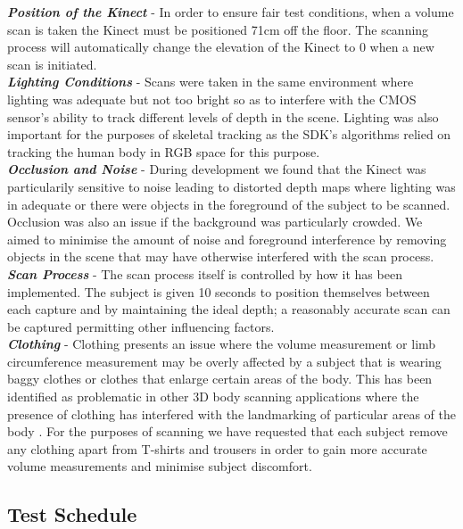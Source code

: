 \emph{\bf{Position of the Kinect}} - In order to ensure fair test conditions, when a volume scan is taken the Kinect must be positioned 71cm off the floor. The scanning process will automatically change the elevation of the Kinect to 0 when a new scan is initiated.\\

\emph{\bf{Lighting Conditions}} - Scans were taken in the same environment where lighting was adequate but not too bright so as to interfere with the CMOS sensor's ability to track different levels of depth in the scene. Lighting was also important for the purposes of skeletal tracking as the SDK's algorithms relied on tracking the human body in RGB space for this purpose. \\

\emph{\bf{Occlusion and Noise}} - During development we found that the Kinect was particularily sensitive to noise leading to distorted depth maps where lighting was in adequate or there were objects in the foreground of the subject to be scanned. Occlusion was also an issue if the background was particularly crowded. We aimed to minimise the amount of noise and foreground interference by removing objects in the scene that may have otherwise interfered with the scan process. \\

\emph{\bf{Scan Process}} - The scan process itself is controlled by how it has been implemented. The subject is given 10 seconds to position themselves between each capture and by maintaining the ideal depth; a reasonably accurate scan can be captured permitting other influencing factors. \\

\emph{\bf{Clothing}} - Clothing presents an issue where the volume measurement or limb circumference measurement may be overly affected by a subject that is wearing baggy clothes or clothes that enlarge certain areas of the body. This has been identified as problematic in other 3D body scanning applications where the presence of clothing has interfered with the landmarking of particular areas of the body \cite{Dekker1999}. For the purposes of scanning we have requested that each subject remove any clothing apart from T-shirts and trousers in order to gain more accurate volume measurements and minimise subject discomfort. \\

\subsection{Test Schedule}

